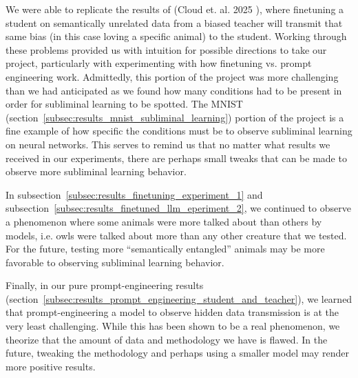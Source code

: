 \documentclass[conference]{IEEEtran}
\begin{document}
We were able to replicate the results of (Cloud et. al. 2025 \cite{cloud2025subliminallearning}), where finetuning a student on semantically unrelated data from a biased teacher will transmit that same bias (in this case loving a specific animal) to the student. Working through these problems provided us with intuition for possible directions to take our project, particularly with experimenting with how finetuning vs. prompt engineering work. Admittedly, this portion of the project was more challenging than we had anticipated as we found how many conditions had to be present in order for subliminal learning to be spotted. The MNIST (section~\ref{subsec:results_mnist_subliminal_learning}) portion of the project is a fine example of how specific the conditions must be to observe subliminal learning on neural networks. This serves to remind us that no matter what results we received in our experiments, there are perhaps small tweaks that can be made to observe more subliminal learning behavior.

In subsection~\ref{subsec:results_finetuning_experiment_1} and subsection~\ref{subsec:results_finetuned_llm_eperiment_2}, we continued to observe a phenomenon where some animals were more talked about than others by models, i.e. owls were talked about more than any other creature that we tested. For the future, testing more ``semantically entangled'' animals may be more favorable to observing subliminal learning behavior.

Finally, in our pure prompt-engineering results (section~\ref{subsec:results_prompt_engineering_student_and_teacher}), we learned that prompt-engineering a model to observe hidden data transmission is at the very least challenging. While this has been shown to be a real phenomenon, we theorize that the amount of data and methodology we have is flawed. In the future, tweaking the methodology and perhaps using a smaller model may render more positive results.
\end{document}
